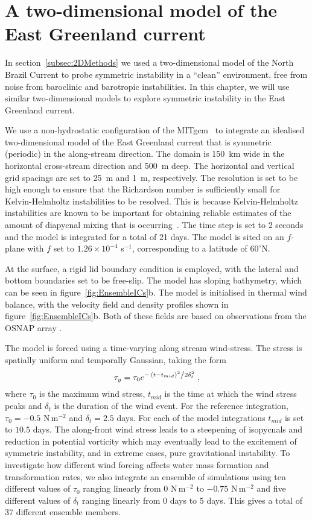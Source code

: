 \section{A two-dimensional model of the East Greenland current}
\label{sec:Irm2DMeth}
In section~\ref{subsec:2DMethods} we used a two-dimensional model of the North Brazil Current to probe symmetric instability in a ``clean'' environment, free from noise from baroclinic and barotropic instabilities. In this chapter, we will use similar two-dimensional models to explore symmetric instability in the East Greenland current.

We use a non-hydrostatic configuration of the MITgcm~\citep{Marshall1997} to integrate an idealised two-dimensional model of the East Greenland current that is symmetric (periodic) in the along-stream direction. The domain is 150~km wide in the horizontal cross-stream direction and 500~m deep. The horizontal and vertical grid spacings are set to 25~m and 1~m, respectively. The resolution is set to be high enough to ensure that the Richardson number is sufficiently small for Kelvin-Helmholtz instabilities to be resolved. This is because Kelvin-Helmholtz instabilities are known to be important for obtaining reliable estimates of the amount of diapycnal mixing that is occurring~\citep{Griffiths2003a, Yankovsky2019}. The time step is set to 2 seconds and the model is integrated for a total of 21 days. The model is sited on an $f$-plane with $f$ set to $1.26 \times 10^{-4}$ s$^{-1}$, corresponding to a latitude of $60^\circ$N. 

At the surface, a rigid lid boundary condition is employed, with the lateral and bottom boundaries set to be free-slip. The model has sloping bathymetry, which can be seen in  figure~\ref{fig:EnsembleICs}b. The model is initialised in thermal wind balance, with the velocity field and density profiles shown in figure~\ref{fig:EnsembleICs}b. Both of these fields are based on observations from the OSNAP array \citep{LeBras2022}.

The model is forced using a time-varying along stream wind-stress. The stress is spatially uniform and temporally Gaussian, taking the form
\begin{equation}
    \tau_y = \tau_0 e^{-\flatfrac{(t - t_{mid})^2}{2\delta_t^2}} \, ,
\end{equation}
where $\tau_0$ is the maximum wind stress, $t_{mid}$ is the time at which the wind stress peaks and $\delta_t$ is the duration of the wind event. For the reference integration, $\tau_0 = - 0.5$ N\,m$^{-2}$ and $\delta_t = 2.5$ days. For each of the model integrations $t_{mid}$ is set to $10.5$ days. The along-front wind stress leads to a steepening of isopycnals and reduction in potential vorticity which may eventually lead to the excitement of symmetric instability, and in extreme cases, pure gravitational instability. To investigate how different wind forcing affects water mass formation and transformation rates, we also integrate an ensemble of simulations using ten different values of $\tau_0$ ranging linearly from $0$ N\,m$^{-2}$ to $-0.75$ N\,m$^{-2}$ and five different values of $\delta_t$ ranging linearly from 0 days to 5 days. This gives a total of 37 different ensemble members.

